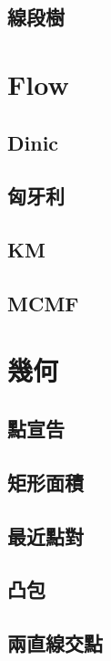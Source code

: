 \documentclass[a4paper,10pt,twocolumn,oneside]{article}
\begin{document}
\subsection{線段樹}

\section{Flow}
\subsection{Dinic}

\subsection{匈牙利}

\subsection{KM}

\subsection{MCMF}

\section{幾何}
\subsection{點宣告}

\subsection{矩形面積}

\subsection{最近點對}

\subsection{凸包}

\subsection{兩直線交點}

\end{document}
